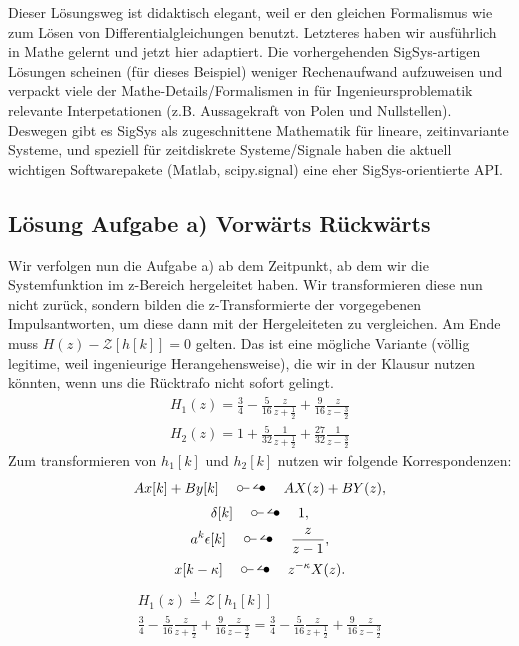 \documentclass[11pt,a4paper,DIV=12]{scrartcl}
\begin{document}
%
%
Dieser Lösungsweg ist didaktisch elegant, weil er den gleichen Formalismus
wie zum Lösen von Differentialgleichungen benutzt.
%
Letzteres haben wir ausführlich in Mathe gelernt und jetzt hier adaptiert.
%
Die vorhergehenden SigSys-artigen Lösungen scheinen (für dieses Beispiel)
weniger Rechenaufwand aufzuweisen und verpackt viele der Mathe-Details/Formalismen
in für Ingenieursproblematik relevante Interpetationen
(z.B. Aussagekraft von Polen und Nullstellen).
%
Deswegen gibt es SigSys als zugeschnittene Mathematik für lineare, zeitinvariante
Systeme, und speziell für zeitdiskrete Systeme/Signale haben die aktuell wichtigen
Softwarepakete (Matlab, scipy.signal) eine eher SigSys-orientierte API.

\newpage
\subsection*{Lösung Aufgabe a) Vorwärts Rückwärts}
\label{eq:H1equalH2}
%
Wir verfolgen nun die Aufgabe a) ab dem Zeitpunkt, ab dem wir die
Systemfunktion im z-Bereich hergeleitet haben.
%
Wir transformieren diese nun nicht zurück, sondern bilden die z-Transformierte
der vorgegebenen Impulsantworten, um diese dann mit der Hergeleiteten zu
vergleichen.
%
Am Ende muss $H(z)-\mathcal{Z}[h[k]]=0$ gelten.
%
Das ist eine mögliche Variante (völlig legitime, weil ingenieurige Herangehensweise),
die wir in der Klausur nutzen könnten, wenn uns die Rücktrafo nicht sofort gelingt.
%
\begin{gather}
	H_1(z)=\frac{3}{4}-\frac{5}{16}\frac{z}{z+\frac{1}{2}}+\frac{9}{16}\frac{z}{z-\frac{3}{2}}\\
	H_2(z)=1+\frac{5}{32}\frac{1}{z+\frac{1}{2}}+\frac{27}{32}\frac{1}{z-\frac{3}{2}}
\end{gather}
%
Zum transformieren von $h_1[k]$ und $h_2[k]$ nutzen wir folgende
Korrespondenzen:
%
\begin{gather}
	Ax[k]+By[k]\quad\ztransf\quad AX(z)+BY(z),\\
	\delta[k]\quad\ztransf\quad 1,\\
	a^k\epsilon[k]\quad\ztransf\quad \frac{z}{z-1},\\
	x[k-\kappa]\quad\ztransf\quad z^{-\kappa}X(z).
\end{gather}
%
\begin{gather}
	H_1(z)\overset{!}{=}\mathcal{Z}\left[h_1[k]\right]\\
	\frac{3}{4}-\frac{5}{16}\frac{z}{z+\frac{1}{2}}+\frac{9}{16}\frac{z}{z-\frac{3}{2}}
	=\frac{3}{4}-\frac{5}{16}\frac{z}{z+\frac{1}{2}}+\frac{9}{16}\frac{z}{z-\frac{3}{2}}\\
\end{gather}
\end{document}
